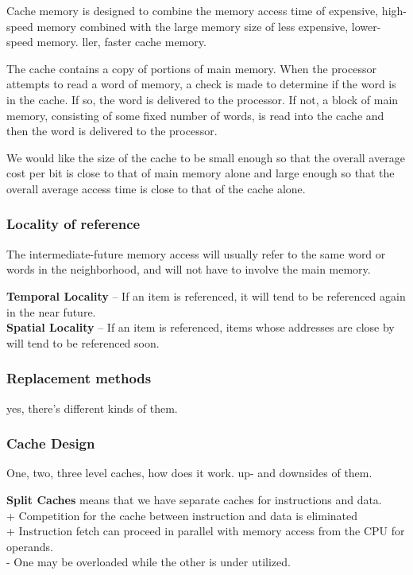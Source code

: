 \documentclass[titlepage, a4paper]{article}
\begin{document}
Cache memory is designed to combine the memory access time of expensive, high-speed memory combined with the large memory size of less expensive, lower-speed memory.
ller, faster cache memory.

The cache contains a copy of portions of main memory. When the processor attempts to read a word of memory, a check is made to determine if the word is in the cache. If so, the word is delivered to the processor. If not, a block of main memory, consisting of some fixed number of words, is read into the cache and then the word is delivered to the processor.

We would like the size of the cache to be small enough so that the overall average cost per bit is close to that of main memory alone and large enough so that the overall average access time is close to that of the cache alone.




\subsubsection{Locality of reference}
The intermediate-future memory access will usually refer to the same word or words in the neighborhood, and will not have to involve the main memory.

\textbf{Temporal Locality} -- If an item is referenced, it will tend to be referenced again in the near future. \\
\textbf{Spatial Locality} -- If an item is referenced, items whose addresses are close by will tend to be referenced soon. \\

\subsubsection{Replacement methods}
yes, there's different kinds of them.

\subsubsection{Cache Design}

One, two, three level caches, how does it work. up- and downsides of them.

\textbf{Split Caches} means that we have separate caches for instructions and data. \\
+ Competition for the cache between instruction and data is eliminated \\
+ Instruction fetch can proceed in parallel with memory access from the CPU for operands. \\
- One may be overloaded while the other is under utilized. \\
\end{document}
